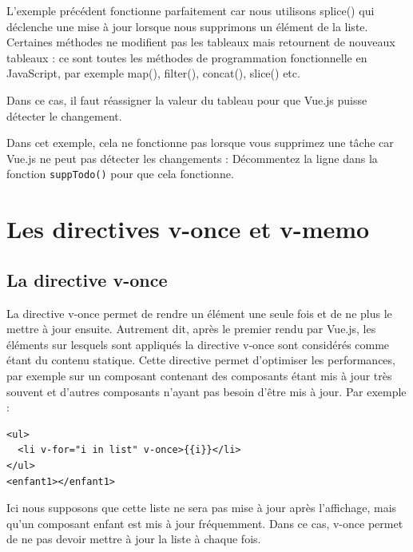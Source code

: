 \documentclass{article}
\begin{document}
L'exemple précédent fonctionne parfaitement car nous utilisons {\color{monOrange}splice()} qui déclenche une mise à jour lorsque nous supprimons un élément de la liste. Certaines méthodes ne modifient pas les tableaux mais retournent de nouveaux tableaux : ce sont toutes les méthodes de programmation fonctionnelle en JavaScript, par exemple {\color{monOrange} map(), filter(), concat(), slice()} etc.

Dans ce cas, il faut réassigner la valeur du tableau pour que {\color{monOrange}Vue.js} puisse détecter le changement.

Dans cet exemple, cela ne fonctionne pas lorsque vous supprimez une tâche car {\color{monOrange}Vue.js} ne peut pas détecter les changements : Décommentez la ligne dans la fonction {\tt suppTodo()} pour que cela fonctionne.


\section{Les directives v-once et v-memo}
\subsection{La directive {\color{monOrange}v-once}}
La directive {\color{monOrange}v-once} permet de rendre un élément une seule fois et de ne plus le mettre à jour ensuite. Autrement dit, après le premier rendu par {\color{monOrange}Vue.js}, les éléments sur lesquels sont appliqués la directive {\color{monOrange}v-once} sont considérés comme étant du contenu statique. Cette directive permet d'optimiser les performances, par exemple sur un composant contenant des composants étant mis à jour très souvent et d'autres composants n'ayant pas besoin d'être mis à jour. Par exemple :
\begin{verbatim}
<ul>
  <li v-for="i in list" v-once>{{i}}</li>
</ul>
<enfant1></enfant1>
\end{verbatim}
Ici nous supposons que cette liste ne sera pas mise à jour après l'affichage, mais qu'un composant enfant est mis à jour fréquemment. Dans ce cas, {\color{monOrange}v-once} permet de ne pas devoir mettre à jour la liste à chaque fois.
\end{document}
